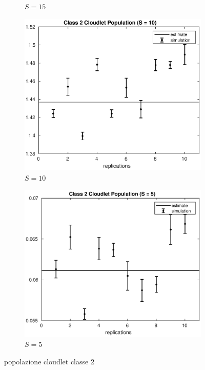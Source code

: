 \begin{figure}[!h]
\begin{subfigure}[t]{0.49\textwidth}
\caption{$S = 15$}
\label{15_n2clet}
\end{subfigure}
%
\begin{subfigure}[t]{0.49\textwidth}
\includegraphics[width=\textwidth]{figures/simul/10_500K_n2clet}
\caption{$S = 10$}
\label{10_n2clet}
\end{subfigure}
%
\begin{subfigure}[t]{0.49\textwidth}
\includegraphics[width=\textwidth]{figures/simul/5_500K_n2clet}
\caption{$S = 5$}
\label{5_n2clet}
\end{subfigure}
%
\caption{popolazione cloudlet classe 2}
\label{plot:n2clet}
\end{figure}
%
%

